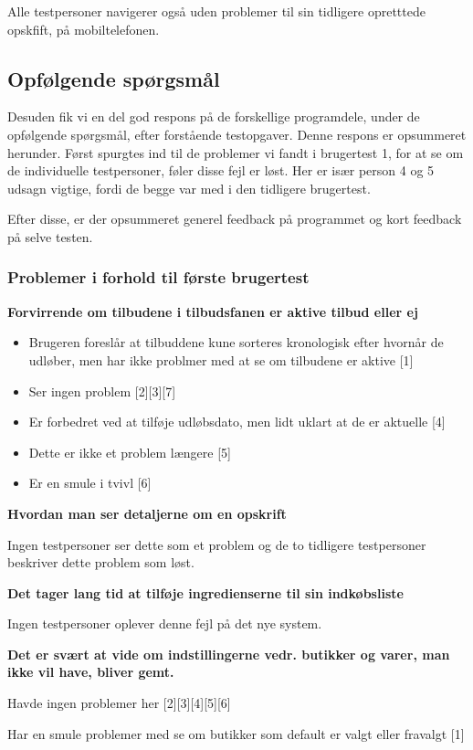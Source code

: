 Alle testpersoner navigerer også uden problemer til sin tidligere opretttede opskfift, på mobiltelefonen.

\subsection{Opfølgende spørgsmål}
Desuden fik vi en del god respons på de forskellige programdele, under de opfølgende spørgsmål, efter forstående testopgaver.
Denne respons er opsummeret herunder.
Først spurgtes ind til de problemer vi fandt i brugertest 1, for at se om de individuelle testpersoner, føler disse fejl er løst. 
Her er især person 4 og 5 udsagn vigtige, fordi de begge var med i den tidligere brugertest.

Efter disse, er der opsummeret generel feedback på programmet og kort feedback på selve testen.

\subsubsection{Problemer i forhold til første brugertest}
\textbf{Forvirrende om tilbudene i tilbudsfanen er aktive tilbud eller ej}
\begin{itemize}
	\item Brugeren foreslår at tilbuddene kune sorteres kronologisk efter hvornår de udløber, men har ikke problmer med at se om tilbudene er aktive [1]
	\item Ser ingen problem [2][3][7]
	\item Er forbedret ved at tilføje udløbsdato, men lidt uklart at de er aktuelle [4]
	\item Dette er ikke et problem længere [5]
	\item Er en smule i tvivl [6]
\end{itemize}
\textbf{Hvordan man ser detaljerne om en opskrift}

Ingen testpersoner ser dette som et problem og de to tidligere testpersoner beskriver dette problem som løst.

\textbf{Det tager lang tid at tilføje ingredienserne til sin indkøbsliste}

Ingen testpersoner oplever denne fejl på det nye system.

\textbf{Det er svært at vide om indstillingerne vedr. butikker og varer, man ikke vil have, bliver gemt.}

Havde ingen problemer her [2][3][4][5][6]

Har en smule problemer med se om butikker som default er valgt eller fravalgt [1]


